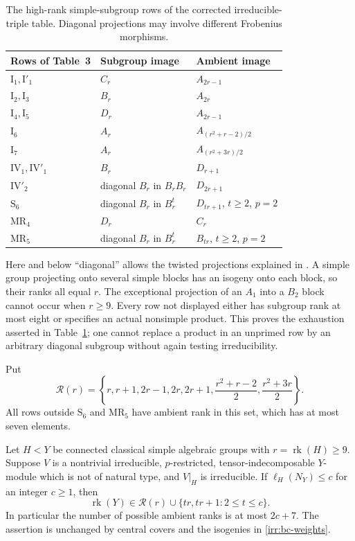 \begin{table}[htbp]
\centering
\small
\begin{tabular}{lll}
\toprule
Rows of Table~3 & Subgroup image & Ambient image\\
\midrule
$\mathrm I_1,\mathrm I'_1$ & $C_r$ & $A_{2r-1}$\\
$\mathrm I_2,\mathrm I_3$ & $B_r$ & $A_{2r}$\\
$\mathrm I_4,\mathrm I_5$ & $D_r$ & $A_{2r-1}$\\
$\mathrm I_6$ & $A_r$ & $A_{(r^2+r-2)/2}$\\
$\mathrm I_7$ & $A_r$ & $A_{(r^2+3r)/2}$\\
$\mathrm {IV}_1,\mathrm {IV}'_1$ & $B_r$ & $D_{r+1}$\\
$\mathrm {IV}'_2$ & diagonal $B_r$ in $B_rB_r$ & $D_{2r+1}$\\
$\mathrm S_6$ & diagonal $B_r$ in $B_r^t$ & $D_{tr+1}$, $t\geq2$, $p=2$\\
$\mathrm {MR}_4$ & $D_r$ & $C_r$\\
$\mathrm {MR}_5$ & diagonal $B_r$ in $B_r^t$ & $B_{tr}$, $t\geq2$, $p=2$\\
\bottomrule
\end{tabular}
\caption{The high-rank simple-subgroup rows of the corrected irreducible-triple
table.  Diagonal projections may involve different Frobenius morphisms.}
\label{irr:high-rank-table}
\end{table}

Here and below ``diagonal'' allows the twisted projections explained in
\cite[Remark~6.1(c)]{BurnessTesterman2018}.  A simple group projecting onto
several simple blocks has an isogeny onto each block, so their ranks all equal
$r$.  The exceptional projection of an $A_1$ into a $B_2$ block cannot occur
when $r\geq9$.  Every row not displayed either has subgroup rank at most
eight or specifies an actual nonsimple product.  This proves the exhaustion
asserted in Table~\ref{irr:high-rank-table}; one cannot replace a product in
an unprimed row by an arbitrary diagonal subgroup without again testing
irreducibility.

Put
\begin{equation}
 \mathcal R(r)=
 \left\{r,r+1,2r-1,2r,2r+1,
 \frac{r^2+r-2}{2},\frac{r^2+3r}{2}\right\}.
 \label{irr:rank-set}
\end{equation}
All rows outside $\mathrm S_6$ and $\mathrm {MR}_5$ have ambient rank in this
set, which has at most seven elements.

\begin{lemma}
\label{irr:rank-length}
Let $H<Y$ be connected classical simple algebraic groups with
$r=\operatorname{rk}(H)\geq9$.  Suppose $V$ is a nontrivial irreducible,
$p$-restricted, tensor-indecomposable $Y$-module which is not of natural type,
and $V|_H$ is irreducible.  If $\ell_H(N_Y)\leq c$ for an integer $c\geq1$, then
\[
 \operatorname{rk}(Y)\in
 \mathcal R(r)\cup\{tr,tr+1:2\leq t\leq c\}.
\]
In particular the number of possible ambient ranks is at most $2c+7$.
The assertion is unchanged by central covers and the isogenies in
\eqref{irr:bc-weights}.
\end{lemma}


